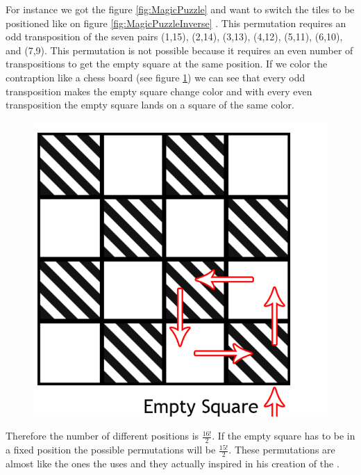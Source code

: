 For instance we got the figure \ref{fig:MagicPuzzle} and want to switch the tiles to be positioned like on figure \ref{fig:MagicPuzzleInverse} \cite[pp. 48-50]{Larsen81}. This permutation requires an odd transposition of the seven pairs (1,15), (2,14), (3,13), (4,12), (5,11), (6,10), and (7,9). This permutation is not possible because it requires an even number of transpositions to get the empty square at the same position. If we color the contraption like a chess board (see figure \ref{fig:Chess}) we can see that every odd transposition makes the empty square change color and with every even transposition the empty square lands on a square of the same color.

\begin{figure}[!h]
\begin{center}
\includegraphics[scale=0.2]{input/pics/MagicPuzzle(EmptySquare).png}
\caption{}
\label{fig:Chess}
\end{center}
\end{figure}

Therefore the number of different positions is $\frac{16!}{2}$. If the empty square has to be in a fixed position the possible permutations will be $\frac{15!}{2}$. These permutations are almost like the ones the \rubik{} uses and they actually inspired \erno{} in his creation of the \rubik{} \cite[pp. 7-9]{Rubik87}.